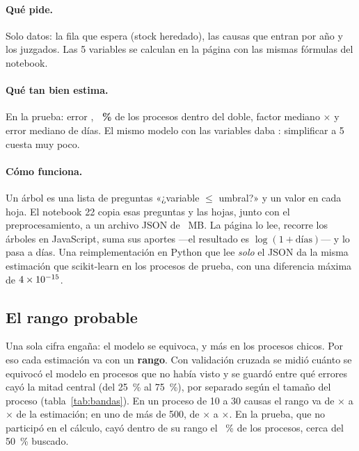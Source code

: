 \documentclass[11pt,a4paper]{article}
\begin{document}
\paragraph{Qué pide.} Solo \nEntradas{} datos: la fila que espera (stock heredado), las causas que entran por año y los
juzgados. Las 5 variables se calculan en la página con las mismas fórmulas del notebook.

\paragraph{Qué tan bien estima.} En la prueba: error \maeDesplegado, \textbf{\dobDesplegado~\%} de los procesos dentro del
doble, factor mediano $\times$\factorDesplegado{} y error mediano de \diasDesplegado{} días. El mismo modelo con las
\nCompleta{} variables daba \maeDesplegadoVeintiocho: simplificar a 5 cuesta muy poco.

\paragraph{Cómo funciona.} Un árbol es una lista de preguntas «¿variable $\le$ umbral?» y un valor en cada hoja. El
notebook 22 copia esas preguntas y las hojas, junto con el preprocesamiento, a un archivo JSON de \pesoJson~MB. La página
lo lee, recorre los árboles en JavaScript, suma sus aportes ---el resultado es $\log(1+\text{días})$--- y lo pasa a días.
Una reimplementación en Python que lee \emph{solo} el JSON da la misma estimación que scikit-learn en los \nPrueba{}
procesos de prueba, con una diferencia máxima de $4\times10^{-15}$.

\subsection{El rango probable}
Una sola cifra engaña: el modelo se equivoca, y más en los procesos chicos. Por eso cada estimación va con un
\textbf{rango}. Con validación cruzada se midió cuánto se equivocó el modelo en procesos que no había visto y se guardó
entre qué errores cayó la mitad central (del 25~\% al 75~\%), por separado según el tamaño del proceso
(tabla~\ref{tab:bandas}). En un proceso de 10 a 30 causas el rango va de $\times$\rangoChicoDesde{} a
$\times$\rangoChicoHasta{} de la estimación; en uno de más de 500, de $\times$\rangoGrandeDesde{} a
$\times$\rangoGrandeHasta. En la prueba, que no participó en el cálculo, cayó dentro de su rango el \coberturaRango~\% de
los procesos, cerca del 50~\% buscado.
\end{document}

